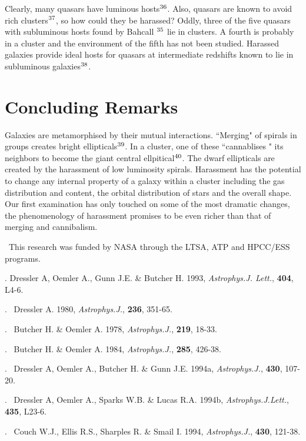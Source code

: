 Clearly, many quasars have luminous hosts$^{\bf\rm 36}$.  Also,
quasars are known to avoid rich clusters$^{\bf\rm 37}$, so how could
they be harassed?  Oddly, three of the five quasars with subluminous
hosts found by Bahcall \etal $^{\bf\rm 35}$ lie in clusters.  A fourth
is probably in a cluster and the environment of the fifth has not been
studied.  Harassed galaxies provide ideal hosts for quasars at
intermediate redshifts known to lie in subluminous galaxies$^{\bf\rm
38}$.

\section{Concluding Remarks}

Galaxies are metamorphised by their mutual interactions.  ``Merging"
of spirals in groups creates bright ellipticals$^{\bf\rm 39}$.  In a
cluster, one of these ``cannablises " its neighbors to become the
giant central ellpitical$^{\bf\rm 40}$.  The dwarf ellipticals are
created by the harassment of low luminosity spirals.  Harassment has
the potential to change any internal property of a galaxy within a
cluster including the gas distribution and content, the orbital
distribution of stars and the overall shape.  Our first examination
has only touched on some of the most dramatic changes, the
phenomenology of harassment promises to be even richer than that of
merging and cannibalism.

\oneskip

 \ This research was funded by NASA
through the LTSA, ATP and HPCC/ESS programs.
\oneskip

\vfil\eject
{}

. Dressler A, Oemler A., Gunn J.E. \& Butcher H.  1993,
{\it Astrophys.J. Lett.}, {\bf 404}, L4-6.

. \ Dressler A. 1980, {\it Astrophys.J.}, {\bf 236}, 351-65.

. \ Butcher H. \& Oemler A. 1978, {\it Astrophys.J.}, {\bf 219}, 18-33.

. \ Butcher H. \& Oemler A. 1984, {\it Astrophys.J.}, {\bf 285}, 426-38.

. \ Dressler A, Oemler A., Butcher H. \& Gunn J.E.  1994a,
{\it Astrophys.J.}, {\bf 430}, 107-20.

. \ Dressler A, Oemler A., Sparks W.B. \& Lucas R.A. 1994b,
{\it Astrophys.J.Lett.}, {\bf 435}, L23-6.

. \ Couch W.J., Ellis R.S., Sharples R. \& Smail I. 1994, {\it
Astrophys.J.},
{\bf 430}, 121-38.

